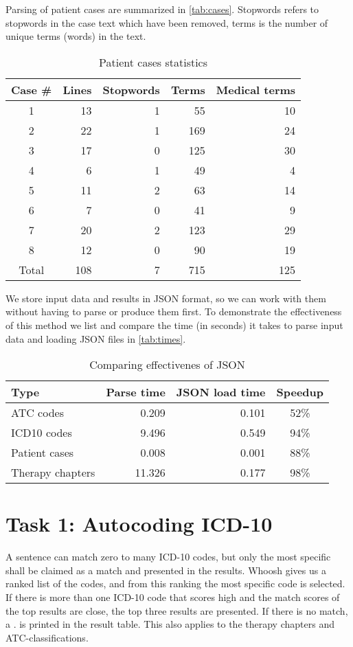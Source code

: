 Parsing of patient cases are summarized in \autoref{tab:cases}. Stopwords
refers to stopwords in the case text which have been removed, terms is the
number of unique terms (words) in the text.
\begin{table}[htbp] \footnotesize \center
\caption{Patient cases statistics\label{tab:cases}}
\begin{tabular}{c r r r r}
    \toprule
	Case \# & Lines & Stopwords & Terms & Medical terms \\
    \midrule
	1 & 13 & 1 & 55 & 10 \\
	2 & 22 & 1 & 169 & 24 \\
	3 & 17 & 0 & 125 & 30 \\
	4 & 6 & 1 & 49 & 4 \\
	5 & 11 & 2 & 63 & 14 \\
	6 & 7 & 0 & 41 & 9 \\
	7 & 20 & 2 & 123 & 29 \\
	8 & 12 & 0 & 90 & 19 \\
    \midrule
	Total & 108 & 7 & 715 & 125 \\
	\bottomrule
\end{tabular}
\end{table}

We store input data and results in JSON format, so we can work with them
without having to parse or produce them first. To demonstrate the
effectiveness of this method we list and compare the time (in seconds) it
takes to parse input data and loading JSON files in \autoref{tab:times}.
\begin{table}[htbp] \footnotesize \center
\caption{Comparing effectivenes of JSON\label{tab:times}}
\begin{tabular}{l r r c}
    \toprule
    Type & Parse time & JSON load time & Speedup \\
    \midrule
	ATC codes & 0.209 & 0.101 & 52\% \\
	ICD10 codes & 9.496 & 0.549 & 94\% \\
	Patient cases & 0.008 & 0.001 & 88\% \\
	Therapy chapters & 11.326 & 0.177 & 98\% \\
	\bottomrule
\end{tabular}
\end{table}


\section{Task 1: Autocoding ICD-10}
A sentence can match zero to many ICD-10 codes, but only the most specific shall be claimed as a match and presented in the results. Whoosh gives us a ranked list of the codes, and from this ranking the most specific code is selected. If there is more than one ICD-10 code that scores high and the match scores of the top results are close, the top three results are presented. If there is no match, a . is printed in the result table. This also applies to the therapy chapters and ATC-classifications. 

